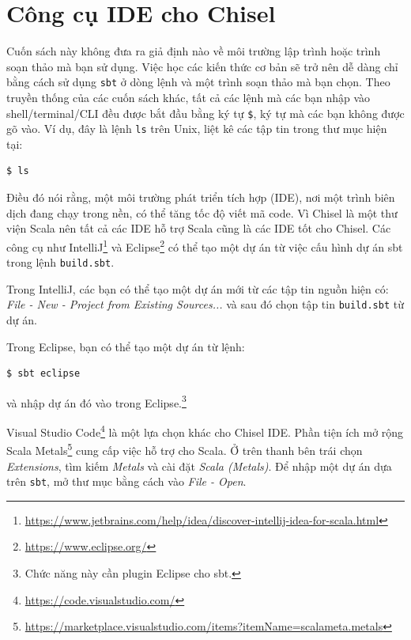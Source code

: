 \documentclass[%
    10pt,
    headinclude, footexclude,
    openright, %
    notitlepage,
    cleardoubleempty,
    headsepline,
    pointlessnumbers,
    bibtotoc, idxtotoc,
    ]{scrbook}
\newcommand{\code}[1]{{\small{\texttt{#1}}}}
\newcommand{\myref}[2]{\href{#1}{#2}}
\renewcommand{\myref}[2]{{#2}{\footnote{\url{#1}}}}
\begin{document}
\section{Công cụ IDE cho Chisel}

Cuốn sách này không đưa ra giả định nào về môi trường lập trình hoặc trình soạn thảo mà bạn sử dụng.
Việc học các kiến thức cơ bản sẽ trở nên dễ dàng chỉ bằng cách sử dụng \code{sbt} ở dòng lệnh và một trình soạn thảo mà bạn chọn. Theo truyền thống của các cuốn sách khác, tất cả các lệnh mà các bạn nhập vào shell/terminal/CLI đều được bắt đầu bằng ký tự \code{\$}, ký tự mà các bạn không được gõ vào. Ví dụ, đây là lệnh \code{ls} trên Unix, liệt kê các tập tin trong thư mục hiện tại:

\begin{verbatim}
$ ls
\end{verbatim}

Điều đó nói rằng, một môi trường phát triển tích hợp (IDE), nơi một trình biên dịch đang chạy trong nền, có thể tăng tốc độ viết mã code. Vì Chisel là một thư viện Scala nên tất cả các IDE hỗ trợ Scala cũng là các IDE tốt cho Chisel.
Các công cụ như
\myref{https://www.jetbrains.com/help/idea/discover-intellij-idea-for-scala.html}{IntelliJ} và
 \myref{https://www.eclipse.org/}{Eclipse}
có thể tạo một dự án từ việc cấu hình dự án sbt trong lệnh \code{build.sbt}.

Trong IntelliJ, các bạn có thể tạo một dự án mới từ các tập tin nguồn hiện có:
\emph{File - New - Project from Existing Sources...} và sau đó chọn tập tin \code{build.sbt}
từ dự án.

Trong Eclipse, bạn có thể tạo một dự án từ lệnh:
\begin{verbatim}
$ sbt eclipse
\end{verbatim}
và nhập dự án đó vào trong Eclipse.\footnote{Chức năng này cần plugin Eclipse cho sbt.}

\myref{https://code.visualstudio.com/}{Visual Studio Code} là một lựa chọn khác cho Chisel IDE. 
Phần tiện ích mở rộng \myref{https://marketplace.visualstudio.com/items?itemName=scalameta.metals}{Scala Metals}
cung cấp việc hỗ trợ cho Scala.
Ở trên thanh bên trái chọn \emph{Extensions}, tìm kiếm \emph{Metals} và cài đặt  \emph{Scala (Metals)}.
Để nhập một dự án dựa trên \code{sbt}, mở thư mục bằng cách vào \emph{File - Open}. 

\end{document}
